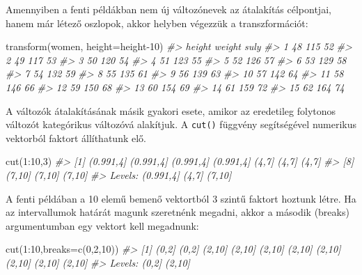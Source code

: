 \documentclass[
]{book}
\newenvironment{Shaded}{\begin{snugshade}}{\end{snugshade}}
\newcommand{\AttributeTok}[1]{\textcolor[rgb]{0.77,0.63,0.00}{#1}}
\newcommand{\CommentTok}[1]{\textcolor[rgb]{0.56,0.35,0.01}{\textit{#1}}}
\newcommand{\DecValTok}[1]{\textcolor[rgb]{0.00,0.00,0.81}{#1}}
\newcommand{\FunctionTok}[1]{\textcolor[rgb]{0.00,0.00,0.00}{#1}}
\newcommand{\NormalTok}[1]{#1}
\newcommand{\SpecialCharTok}[1]{\textcolor[rgb]{0.00,0.00,0.00}{#1}}
\begin{document}
Amennyiben a fenti példákban nem új változónevek az átalakítás célpontjai, hanem már létező oszlopok, akkor helyben végezzük a transzformációt:

\begin{Shaded}
\begin{Highlighting}[]
\FunctionTok{transform}\NormalTok{(women, }\AttributeTok{height=}\NormalTok{height}\DecValTok{{-}10}\NormalTok{)}
\CommentTok{\#\textgreater{}    height weight suly}
\CommentTok{\#\textgreater{} 1      48    115   52}
\CommentTok{\#\textgreater{} 2      49    117   53}
\CommentTok{\#\textgreater{} 3      50    120   54}
\CommentTok{\#\textgreater{} 4      51    123   55}
\CommentTok{\#\textgreater{} 5      52    126   57}
\CommentTok{\#\textgreater{} 6      53    129   58}
\CommentTok{\#\textgreater{} 7      54    132   59}
\CommentTok{\#\textgreater{} 8      55    135   61}
\CommentTok{\#\textgreater{} 9      56    139   63}
\CommentTok{\#\textgreater{} 10     57    142   64}
\CommentTok{\#\textgreater{} 11     58    146   66}
\CommentTok{\#\textgreater{} 12     59    150   68}
\CommentTok{\#\textgreater{} 13     60    154   69}
\CommentTok{\#\textgreater{} 14     61    159   72}
\CommentTok{\#\textgreater{} 15     62    164   74}
\end{Highlighting}
\end{Shaded}

A változók átalakításának másik gyakori esete, amikor az eredetileg folytonos változót kategórikus változóvá alakítjuk. A \texttt{cut()} függvény segítségével numerikus vektorból faktort állíthatunk elő.

\begin{Shaded}
\begin{Highlighting}[]
\FunctionTok{cut}\NormalTok{(}\DecValTok{1}\SpecialCharTok{:}\DecValTok{10}\NormalTok{,}\DecValTok{3}\NormalTok{)}
\CommentTok{\#\textgreater{}  [1] (0.991,4] (0.991,4] (0.991,4] (0.991,4] (4,7]     (4,7]     (4,7]    }
\CommentTok{\#\textgreater{}  [8] (7,10]    (7,10]    (7,10]   }
\CommentTok{\#\textgreater{} Levels: (0.991,4] (4,7] (7,10]}
\end{Highlighting}
\end{Shaded}

A fenti példában a 10 elemű bemenő vektortból 3 szintű faktort hoztunk létre. Ha az intervallumok határát magunk szeretnénk megadni, akkor a második (breaks) argumentumban egy vektort kell megadnunk:

\begin{Shaded}
\begin{Highlighting}[]
\FunctionTok{cut}\NormalTok{(}\DecValTok{1}\SpecialCharTok{:}\DecValTok{10}\NormalTok{,}\AttributeTok{breaks=}\FunctionTok{c}\NormalTok{(}\DecValTok{0}\NormalTok{,}\DecValTok{2}\NormalTok{,}\DecValTok{10}\NormalTok{))}
\CommentTok{\#\textgreater{}  [1] (0,2]  (0,2]  (2,10] (2,10] (2,10] (2,10] (2,10] (2,10] (2,10] (2,10]}
\CommentTok{\#\textgreater{} Levels: (0,2] (2,10]}
\end{Highlighting}
\end{Shaded}
\end{document}
